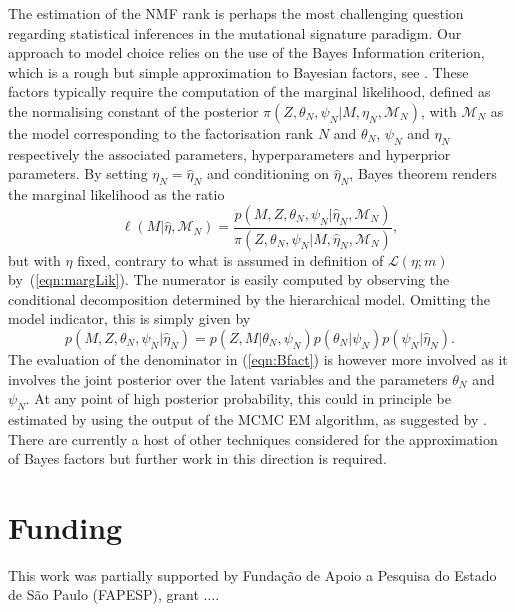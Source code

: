 \documentclass{bioinfo}
\newcommand{\Mord}{\mathcal{M}_N}
\begin{document}
The estimation of the NMF rank is perhaps the most challenging
question regarding statistical inferences in the mutational signature
paradigm. Our approach to model choice relies on the use of the Bayes 
Information criterion, which is a rough but simple approximation to
Bayesian factors, see \cite{KR}. These factors typically require the
computation of the marginal likelihood, defined as the normalising
constant of the posterior $\pi(Z, \theta_N, \psi_N|M, \eta_N, \Mord)$,
with $\Mord$ as the model corresponding to the
factorisation rank $N$ and $\theta_N$, $\psi_N$ and $\eta_N$
respectively the associated parameters, hyperparameters and hyperprior
parameters. By setting $\eta_N = \hat\eta_N$ and conditioning on
$\hat\eta_N$, Bayes theorem renders the marginal likelihood as the
ratio
\begin{equation}
  \label{eqn:Bfact}
   \ell(M|\hat \eta, \Mord) 
  = 
    \frac{p(M, Z, \theta_N, \psi_N|\hat\eta_N, \Mord)}
    {\pi(Z, \theta_N, \psi_N|M, \hat\eta_N, \Mord)},
\end{equation}
but with $\eta$ fixed, contrary to what is assumed in definition of
$\mathcal L(\eta; m)$ by~(\ref{eqn:margLik}). The numerator is easily 
computed by observing the conditional decomposition determined by the
hierarchical model. Omitting the model indicator, this is simply given
by 
\[
  p(M, Z, \theta_N, \psi_N|\hat\eta_N) 
  = 
  p(Z, M|\theta_N, \psi_N) p(\theta_N|\psi_N) p(\psi_N|\hat\eta_N).
\]
The evaluation of the denominator in (\ref{eqn:Bfact}) is however more
involved as it involves the joint posterior over the latent variables
and the parameters $\theta_N$ and $\psi_N$. At any point of high
posterior probability, this could in principle be estimated by using
the output of the MCMC EM algorithm, as suggested by \cite{Ch}. There
are currently a host of other techniques considered for the
approximation of Bayes factors but further work in this direction is
required.


\section*{Funding}
This work was partially supported by Funda\c{c}\~ao de Apoio a
Pesquisa do Estado de S\~ao Paulo (FAPESP), grant $\ldots$. 

 

\end{document}
